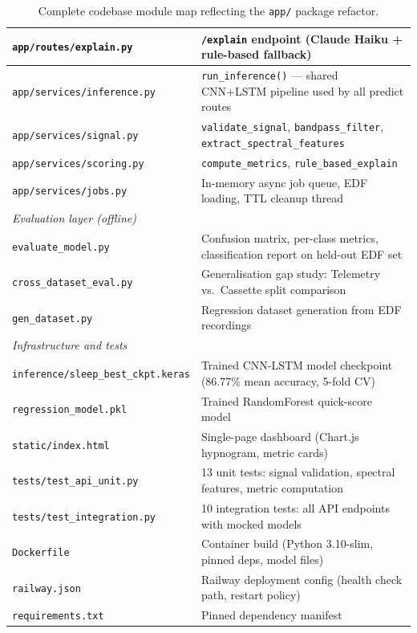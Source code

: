 \documentclass[10pt]{article}
\begin{document}
\begin{table}[h]
\begin{tabular}{|l|p{8.5cm}|}
\texttt{app/routes/explain.py} & \texttt{/explain} endpoint (Claude Haiku + rule-based fallback) \\\hline
\texttt{app/services/inference.py} & \texttt{run\_inference()} — shared CNN+LSTM pipeline used by all predict routes \\\hline
\texttt{app/services/signal.py} & \texttt{validate\_signal}, \texttt{bandpass\_filter}, \texttt{extract\_spectral\_features} \\\hline
\texttt{app/services/scoring.py} & \texttt{compute\_metrics}, \texttt{rule\_based\_explain} \\\hline
\texttt{app/services/jobs.py} & In-memory async job queue, EDF loading, TTL cleanup thread \\\hline
\multicolumn{2}{|l|}{\textit{Evaluation layer (offline)}} \\\hline
\texttt{evaluate\_model.py} & Confusion matrix, per-class metrics, classification report on held-out EDF set \\\hline
\texttt{cross\_dataset\_eval.py} & Generalisation gap study: Telemetry vs.\ Cassette split comparison \\\hline
\texttt{gen\_dataset.py} & Regression dataset generation from EDF recordings \\\hline
\multicolumn{2}{|l|}{\textit{Infrastructure and tests}} \\\hline
\texttt{inference/sleep\_best\_ckpt.keras} & Trained CNN-LSTM model checkpoint (86.77\% mean accuracy, 5-fold CV) \\\hline
\texttt{regression\_model.pkl} & Trained RandomForest quick-score model \\\hline
\texttt{static/index.html} & Single-page dashboard (Chart.js hypnogram, metric cards) \\\hline
\texttt{tests/test\_api\_unit.py} & 13 unit tests: signal validation, spectral features, metric computation \\\hline
\texttt{tests/test\_integration.py} & 10 integration tests: all API endpoints with mocked models \\\hline
\texttt{Dockerfile} & Container build (Python 3.10-slim, pinned deps, model files) \\\hline
\texttt{railway.json} & Railway deployment config (health check path, restart policy) \\\hline
\texttt{requirements.txt} & Pinned dependency manifest \\\hline
\end{tabular}
\caption{Complete codebase module map reflecting the \texttt{app/} package refactor.}
\label{tab:codebase}
\end{table}
\end{document}

